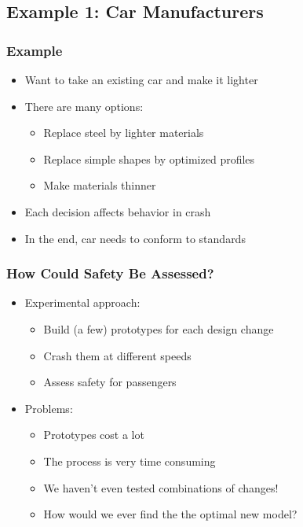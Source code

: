 \documentclass[11pt]{beamer}
\begin{document}
\subsection{Example 1: Car Manufacturers}

\begin{frame}[c]\frametitle{Example}
    \begin{itemize}
        \item Want to take an existing car and make it lighter
        \item There are many options:
        \begin{itemize}
            \item Replace steel by lighter materials
            \item Replace simple shapes by optimized profiles
            \item Make materials thinner
        \end{itemize}
        \item Each decision affects behavior in crash
        \item In the end, car needs to conform to standards
    \end{itemize}
\end{frame}


\begin{frame}[c]\frametitle{How Could Safety Be Assessed?}
    \begin{itemize}
        \item Experimental approach:
        \begin{itemize}
            \item Build (a few) prototypes for each design change
            \item Crash them at different speeds
            \item Assess safety for passengers
        \end{itemize}
        \item Problems:
        \begin{itemize}
            \item Prototypes cost a lot
            \item The process is very time consuming
            \item We haven't even tested combinations of changes!
            \item How would we ever find the the optimal new model?
        \end{itemize}
    \end{itemize}
\end{frame}
\end{document}
